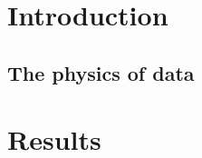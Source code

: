 \documentclass[ twoside,openright,titlepage,numbers=noenddot,%
 headinclude,footinclude,cleardoublepage=empty,abstract=on,
 BCOR=5mm,paper=a4,fontsize=11pt
]{scrreprt}
\theoremstyle{plain}
\begin{document}
\frenchspacing
\raggedbottom
{}
\pagestyle{plain}


\cleardoublepage
\cleardoublepage

\pagestyle{scrheadings}
\part{Introduction}\label{pt:introduction}
\chapter{The physics of data}


\part{Results}\label{pt:results}



\appendix
\cleardoublepage
\end{document}
